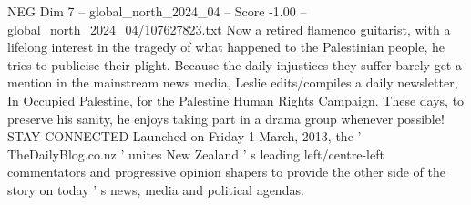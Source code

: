 \begin{textsample}{NEG Dim 7 – global\_north\_2024\_04 – Score -1.00 – global\_north\_2024\_04/107627823.txt}
Now a retired flamenco guitarist, with a lifelong interest in the tragedy of what happened to the Palestinian people, he tries to publicise their plight.
Because the daily injustices they suffer barely get a mention in the mainstream news media, Leslie edits/compiles a daily newsletter, In Occupied Palestine, for the Palestine Human Rights Campaign.
These days, to preserve his sanity, he enjoys taking part in a drama group whenever possible!
STAY CONNECTED Launched on Friday 1 March, 2013, the ' TheDailyBlog.co.nz ' unites New Zealand ' s leading left/centre-left commentators and progressive opinion shapers to provide the other side of the story on today ' s news, media and political agendas.

\end{textsample}
